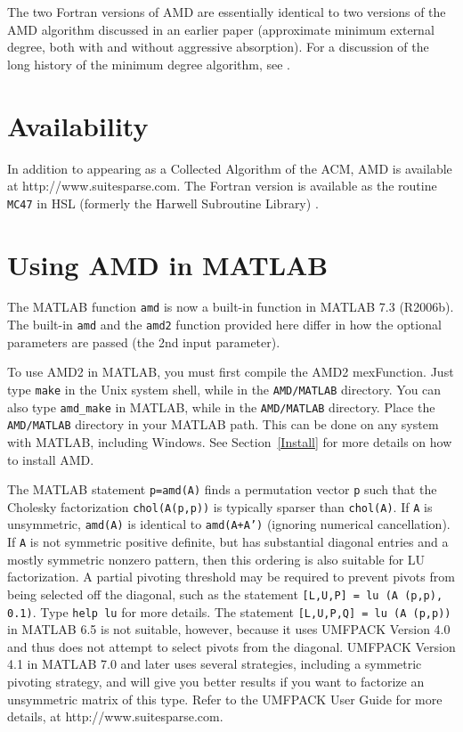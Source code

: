 \documentclass[11pt]{article}
\begin{document}
The two Fortran versions of AMD are essentially identical to two versions of
the AMD algorithm discussed in an earlier paper \cite{AmestoyDavisDuff96}
(approximate minimum external degree, both with and without aggressive
absorption).
For a discussion of the long history of the minimum degree algorithm,
see \cite{GeorgeLiu89}.

\section{Availability}

In addition to appearing as a Collected Algorithm of the ACM, \newline
AMD is available at http://www.suitesparse.com.
The Fortran version is available as the routine {\tt MC47} in HSL
(formerly the Harwell Subroutine Library) \cite{hsl:2002}.

\section{Using AMD in MATLAB}

The MATLAB function {\tt amd} is now a built-in function in MATLAB 7.3
(R2006b).  The built-in {\tt amd} and the {\tt amd2} function provided here
differ in how the optional parameters are passed
(the 2nd input parameter).

To use AMD2 in MATLAB, you must first compile the AMD2 mexFunction.
Just type {\tt make} in the Unix system shell, while in the {\tt AMD/MATLAB}
directory.  You can also type {\tt amd\_make} in MATLAB, while in the
{\tt AMD/MATLAB} directory.  Place the {\tt AMD/MATLAB} directory in your
MATLAB path.  This can be done on any system with MATLAB, including Windows.
See Section~\ref{Install} for more details on how to install AMD.

The MATLAB statement {\tt p=amd(A)} finds a permutation vector {\tt p} such
that the Cholesky factorization {\tt chol(A(p,p))} is typically sparser than
{\tt chol(A)}.
If {\tt A} is unsymmetric, {\tt amd(A)} is identical to {\tt amd(A+A')}
(ignoring numerical cancellation).
If {\tt A} is not symmetric positive definite,
but has substantial diagonal entries and a mostly symmetric nonzero pattern,
then this ordering is also suitable for LU factorization.  A partial pivoting
threshold may be required to prevent pivots from being selected off the
diagonal, such as the statement {\tt [L,U,P] = lu (A (p,p), 0.1)}.
Type {\tt help lu} for more details.
The statement {\tt [L,U,P,Q] = lu (A (p,p))} in MATLAB 6.5 is
not suitable, however, because it uses UMFPACK Version 4.0 and thus
does not attempt to select pivots from the diagonal.
UMFPACK Version 4.1 in MATLAB 7.0 and later
uses several strategies, including a symmetric pivoting strategy, and
will give you better results if you want to factorize an unsymmetric matrix
of this type.  Refer to the UMFPACK User Guide for more details, at
http://www.suitesparse.com.
\end{document}
